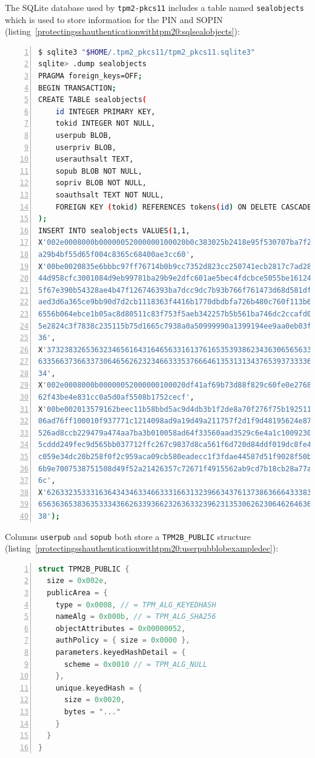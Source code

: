 The SQLite database used by \texttt{tpm2-pkcs11}
includes a table named \texttt{sealobjects} which is
used to store information for the PIN and SOPIN
(listing~\ref{protectingsshauthenticationwithtpm20:sqlsealobjects}):

\begin{lstlisting}[language=sh, numbers=left, caption={Content of \texttt{sealobjects} database in \texttt{tpm2-pkcs11} database}, label=protectingsshauthenticationwithtpm20:sqlsealobjects]
$ sqlite3 "$HOME/.tpm2_pkcs11/tpm2_pkcs11.sqlite3"
sqlite> .dump sealobjects
PRAGMA foreign_keys=OFF;
BEGIN TRANSACTION;
CREATE TABLE sealobjects(
    id INTEGER PRIMARY KEY,
    tokid INTEGER NOT NULL,
    userpub BLOB,
    userpriv BLOB,
    userauthsalt TEXT,
    sopub BLOB NOT NULL,
    sopriv BLOB NOT NULL,
    soauthsalt TEXT NOT NULL,
    FOREIGN KEY (tokid) REFERENCES tokens(id) ON DELETE CASCADE
);
INSERT INTO sealobjects VALUES(1,1,
X'002e0008000b00000052000000100020b0c383025b2418e95f530707ba7f28
a29b4bf55d65f004c8365c68400ae3cc60',
X'00be0020835e6bbbc97ff76714b0b9cc7352d823cc250741ecb2817c7ad28b
44d958cfc3001084d9eb99781ba29b9e2dfc601ae5bec4fdcbce5055be161244
5f67e390b54328ae4b47f126746393ba7dcc9dc7b93b766f761473d68d581dfd
aed3d6a365ce9bb90d7d2cb1118363f4416b1770dbdbfa726b480c760f113b69
6556b064ebce1b05ac8d80511c83f753f5aeb342257b5b561ba746dc2ccafd0f
5e2824c3f7838c235115b75d1665c7938a0a50999990a1399194ee9aa0eb03f8
36',
X'37323832653632346561643164656331613761653539386234363065656336
6335663736633730646562623234663335376664613531313437653937333365
34',
X'002e0008000b00000052000000100020df41af69b73d88f829c60fe0e27687
62f43be4e831cc0a5d0af5508b1752cecf',
X'00be002013579162beec11b58bbd5ac9d4db3b1f2de8a70f276f75b1925111
06ad76ff100010f937771c1214098ad9a19d49a211757f2d1f9d48195624e87c
526ad8ccb229479a474aa7ba3b010058ad64f33560aad3529c6e4a1c10092304
5cddd249fec9d565bb037712ffc267c9837d8ca561f6d720d84ddf019dc8fe45
c059e34dc20b258f0f2c959aca09cb580eadecc1f3fdae44587d51f9028f50b4
6b9e7007538751508d49f52a21426357c72671f4915562ab9cd7b18cb28a77ac
6c',
X'62633235333163643434633466333166313239663437613738636664333834
6563636538363533343662633936623263633239623135306262306462646362
38');
\end{lstlisting}

Columns \texttt{userpub} and
\texttt{sopub} both store a
\texttt{TPM2B\_PUBLIC} structure
(listing~\ref{protectingsshauthenticationwithtpm20:userpubblobexampledec}):

\begin{lstlisting}[language=C, numbers=left, caption={Extract of the deserialization of the content of \texttt{userpub} and \texttt{sopub} columns}, label=protectingsshauthenticationwithtpm20:userpubblobexampledec]
struct TPM2B_PUBLIC {
  size = 0x002e,
  publicArea = {
    type = 0x0008, // = TPM_ALG_KEYEDHASH
    nameAlg = 0x000b, // = TPM_ALG_SHA256
    objectAttributes = 0x00000052,
    authPolicy = { size = 0x0000 },
    parameters.keyedHashDetail = {
      scheme = 0x0010 // = TPM_ALG_NULL
    },
    unique.keyedHash = {
      size = 0x0020,
      bytes = "..."
    }
  }
}
\end{lstlisting}

